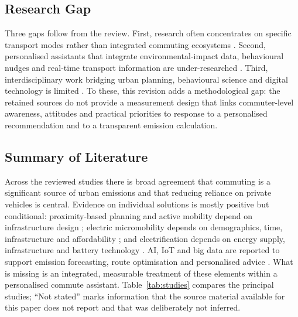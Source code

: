 \documentclass[11pt,a4paper]{article}
\begin{document}
\subsection{Research Gap}
Three gaps follow from the review. First, research often concentrates on specific transport modes
rather than integrated commuting ecosystems \citep{kashem2025}. Second, personalised assistants that
integrate environmental-impact data, behavioural nudges and real-time transport information are
under-researched \citep{ouyang2025}. Third, interdisciplinary work bridging urban planning,
behavioural science and digital technology is limited \citep{eslami2025}. To these, this revision adds
a methodological gap: the retained sources do not provide a measurement design that links
commuter-level awareness, attitudes and practical priorities to response to a personalised
recommendation and to a transparent emission calculation.

\subsection{Summary of Literature}
Across the reviewed studies there is broad agreement that commuting is a significant source of urban
emissions and that reducing reliance on private vehicles is central. Evidence on individual solutions
is mostly positive but conditional: proximity-based planning and active mobility depend on
infrastructure design \citep{marzolla2025}; electric micromobility depends on demographics, time,
infrastructure and affordability \citep{wu2025}; and electrification depends on energy supply,
infrastructure and battery technology \citep{ndhlovu2025,ouyang2025}. AI, IoT and big data are
reported to support emission forecasting, route optimisation and personalised advice
\citep{kashem2025,ouyang2025}. What is missing is an integrated, measurable treatment of these
elements within a personalised commute assistant. Table~\ref{tab:studies} compares the principal
studies; ``Not stated'' marks information that the source material available for this paper does not
report and that was deliberately not inferred.
\end{document}
